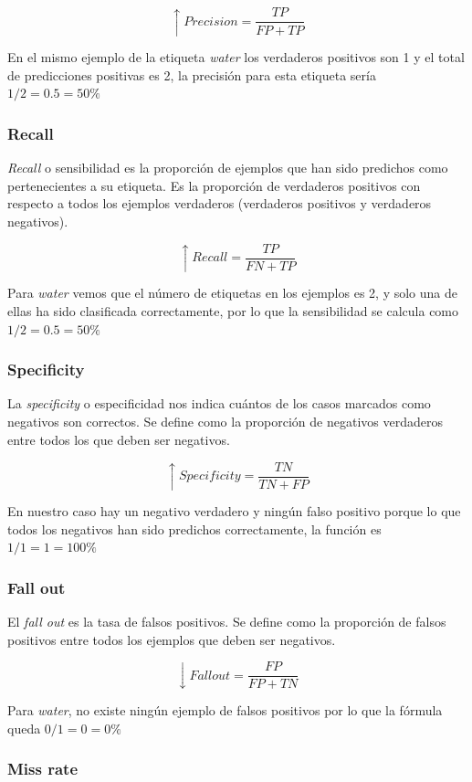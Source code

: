\[\uparrow Precision = \frac{TP}{FP + TP}\]

En el mismo ejemplo de la etiqueta \textit{water} los verdaderos positivos son 1 y el total de predicciones positivas es 2, la precisión para esta etiqueta sería \(1 / 2 = 0.5 = 50\%\)


\subsubsection{Recall}

\textit{Recall} o sensibilidad es la proporción de ejemplos que han sido predichos como pertenecientes a su etiqueta. Es la proporción de verdaderos positivos con respecto a todos los ejemplos verdaderos (verdaderos positivos y verdaderos negativos).

\[\uparrow Recall = \frac{TP}{FN + TP}\]

Para \textit{water} vemos que el número de etiquetas en los ejemplos es 2, y solo una de ellas ha sido clasificada correctamente, por lo que la sensibilidad se calcula como \(1 / 2 = 0.5 = 50\%\)

\subsubsection{Specificity}

La \textit{specificity} o especificidad nos indica cuántos de los casos marcados como negativos son correctos. Se define como la proporción de negativos verdaderos entre todos los que deben ser negativos.

\[\uparrow Specificity = \frac{TN}{TN + FP}\]

En nuestro caso hay un negativo verdadero y ningún falso positivo porque lo que todos los negativos han sido predichos correctamente, la función es \(1 / 1 = 1 = 100\%\)

\subsubsection{Fall out}

El \textit{fall out} es la tasa de falsos positivos. Se define como la proporción de falsos positivos entre todos los ejemplos que deben ser negativos.

\[\downarrow Fall out = \frac{FP}{FP + TN}\]

Para \textit{water}, no existe ningún ejemplo de falsos positivos por lo que la fórmula queda \(0 / 1 = 0 = 0\%\)

\subsubsection{Miss rate}

